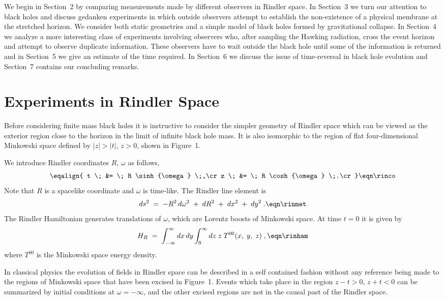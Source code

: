 We begin in Section~2 by comparing measurements made by different
observers in Rindler space.  In Section~3 we turn our attention to
black holes and discuss gedanken experiments in which outside
observers attempt to establish the non-existence of a physical
membrane at the stretched horizon.  We consider both static
geometries and a simple model of black holes formed by gravitational
collapse.  In Section~4 we analyze a more interesting class of
experiments involving observers who, after sampling the Hawking
radiation, cross the event horizon and attempt to observe duplicate
information.  These observers have to wait outside the black hole
until some of the information is returned and in Section~5 we give an
estimate of the time required.  In Section~6 we discuss the issue of
time-reversal in black hole evolution and Section~7 contains our
concluding remarks.

\chapter{Experiments in Rindler Space}

Before considering finite mass black holes it is instructive to
consider the simpler geometry of Rindler space which can be viewed as
the exterior region close to the horizon in the limit of infinite
black hole mass.  It is also isomorphic to the region of flat
four-dimensional Minkowski space defined by
$\vert z \vert  > \vert t  \vert$, $z>0$, shown in Figure~1.

We introduce Rindler coordinates $R$, $\omega$ as follows,
$$\eqalign{
t \; &= \; R \sinh{\omega} \;,\cr
z \; &= \; R \cosh{\omega} \;.\cr}
\eqn\rinco
$$
Note that $R$ is a spacelike coordinate and $\omega$ is time-like.
The Rindler line element is
$$
ds^2 \; = \;
-R^2\,d \omega^2 \; + \; dR^2 \; + \; dx^2 \; + \; dy^2 \;.
\eqn\rinmet
$$
The Rindler Hamiltonian generates translations of $\omega$, which are
Lorentz boosts of Minkowski space.  At time $t = 0$ it is given by
$$
H_R \; = \; \int_{-\infty}^\infty dx\,dy \int_0^\infty dz \;
z\; T^{00} (x, \; y, \; z)  \;,
\eqn\rinham
$$
where $T^{00}$ is the Minkowski space energy density.

In classical physics the evolution of fields in Rindler space can be
described in a self contained fashion without any reference being
made to the regions of Minkowski space that have been excised in
Figure~1.  Events which take place in the region $z-t>0$, $z+t<0$ can
be summarized by initial conditions at $\omega =-\infty$, and the
other excised regions are not in the causal past of the Rindler
space.

